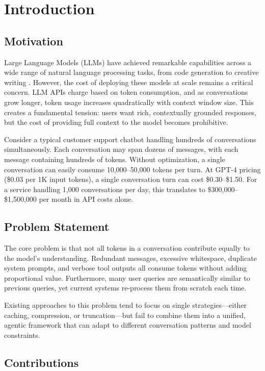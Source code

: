 \section{Introduction}

\subsection{Motivation}

Large Language Models (LLMs) have achieved remarkable capabilities across a wide range of natural language processing tasks, from code generation to creative writing \cite{brown2020}. However, the cost of deploying these models at scale remains a critical concern. LLM APIs charge based on token consumption, and as conversations grow longer, token usage increases quadratically with context window size. This creates a fundamental tension: users want rich, contextually grounded responses, but the cost of providing full context to the model becomes prohibitive.

Consider a typical customer support chatbot handling hundreds of conversations simultaneously. Each conversation may span dozens of messages, with each message containing hundreds of tokens. Without optimization, a single conversation can easily consume 10,000--50,000 tokens per turn. At GPT-4 pricing (\$0.03 per 1K input tokens), a single conversation turn can cost \$0.30--\$1.50. For a service handling 1,000 conversations per day, this translates to \$300,000--\$1,500,000 per month in API costs alone.

\subsection{Problem Statement}

The core problem is that not all tokens in a conversation contribute equally to the model's understanding. Redundant messages, excessive whitespace, duplicate system prompts, and verbose tool outputs all consume tokens without adding proportional value. Furthermore, many user queries are semantically similar to previous queries, yet current systems re-process them from scratch each time.

Existing approaches to this problem tend to focus on single strategies---either caching, compression, or truncation---but fail to combine them into a unified, agentic framework that can adapt to different conversation patterns and model constraints.

\subsection{Contributions}

